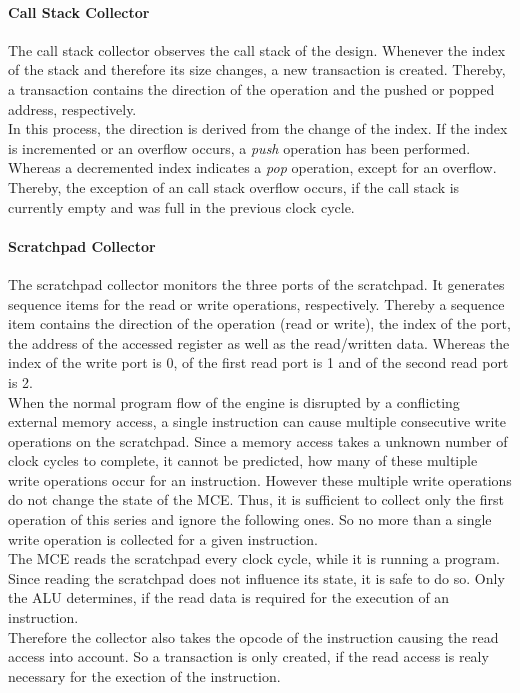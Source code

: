 \paragraph{Call Stack Collector}

The call stack collector observes the call stack of the design.
Whenever the index of the stack and therefore its size changes, a new transaction is created.
Thereby, a transaction contains the direction of the operation and the pushed or popped address, respectively.\\
In this process, the direction is derived from the change of the index.
If the index is incremented or an overflow occurs, a \emph{push} operation has been performed.
Whereas a decremented index indicates a \emph{pop} operation, except for an overflow.
Thereby, the exception of an call stack overflow occurs, if the call stack is currently empty and was full in the previous clock cycle.

\paragraph{Scratchpad Collector}

The scratchpad collector monitors the three ports of the scratchpad.
It generates sequence items for the read or write operations, respectively.
Thereby a sequence item contains the direction of the operation (read or write), the index of the port, the address of the accessed register as well as the read/written data.
Whereas the index of the write port is 0, of the first read port is 1 and of the second read port is 2.\\
When the normal program flow of the engine is disrupted by a conflicting external memory access, a single instruction can cause multiple consecutive write operations on the scratchpad. 
Since a memory access takes a unknown number of clock cycles to complete, it cannot be predicted, how many of these multiple write operations occur for an instruction.
However these multiple write operations do not change the state of the MCE.
Thus, it is sufficient to collect only the first operation of this series and ignore the following ones.
So no more than a single write operation is collected for a given instruction.\\
The MCE reads the scratchpad every clock cycle, while it is running a program.
Since reading the scratchpad does not influence its state, it is safe to do so.
Only the ALU determines, if the read data is required for the execution of an instruction.\\
Therefore the collector also takes the opcode of the instruction causing the read access into account.
So a transaction is only created, if the read access is realy necessary for the exection of the instruction.

